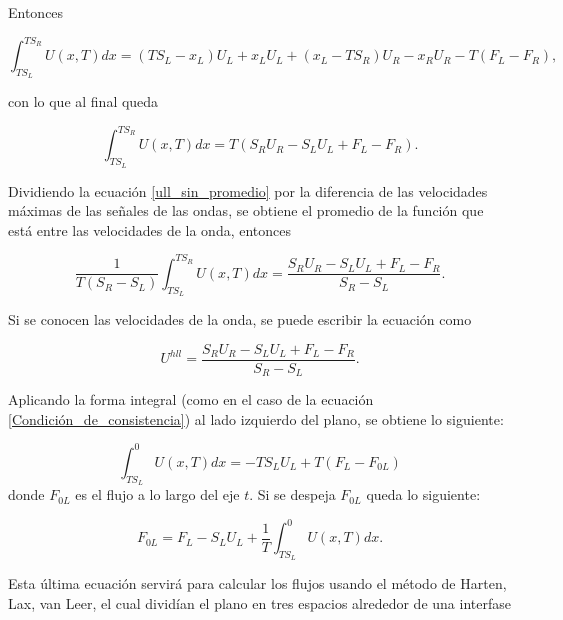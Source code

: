 \documentclass[12pt,a4paper]{book}
\begin{document}
\noindent Entonces 

\begin{equation*}
\int_{T S_L}^{T S_R} U \left(x, T \right)dx=
\left( T S_L - x_L \right) U_L+ x_L U_L +
\left( x_L - T S_R \right) U_R-x_R U_R -
T \left( F_L- F_R \right),
\end{equation*}

\noindent con lo que al final queda

\begin{equation} \label{ull_sin_promedio}
\int_{T S_L}^{T S_R} U \left(x, T \right)dx=
T \left( S_R U_R - S_L U_L + F_L - F_R \right).
\end{equation}

\noindent Dividiendo la ecuación \ref{ull_sin_promedio} por la diferencia de las velocidades máximas de las señales de las ondas, se obtiene el promedio de la función que está entre las velocidades de la onda, entonces

\begin{equation}
\frac{1}{T \left( S_R -S_L \right)}\int_{T S_L}^{T S_R} U \left(x, T \right)dx =
\frac{S_R U_R - S_L U_L + F_L - F_R}{S_R - S_L}.
\end{equation}

\noindent Si se conocen las velocidades de la onda, se puede escribir la ecuación como 

\begin{equation}\label{u_hll}
U^{hll} = \frac{S_R U_R - S_L U_L + F_L - F_R}{S_R - S_L}.
\end{equation}

\noindent Aplicando la forma integral (como en el caso de la ecuación \ref{Condición_de_consistencia}) al lado izquierdo del plano, se obtiene lo siguiente:

\begin{equation}
\int_{T S_L}^{0} U\left( x, T \right) dx = 
-T S_L U_L+T \left( F_L- F_{0L} \right)
\end{equation}
donde $F_{0L}$ es el flujo a lo largo del eje $t$. Si se despeja $F_{0L}$ queda lo siguiente:

\begin{equation}\label{ec F_0L}
F_{0L} = F_L - S_L U_L + \frac{1}{T}  \int_{T S_L}^{0} U\left( x, T \right) dx.
\end{equation}

\noindent Esta última ecuación servirá para calcular los flujos usando el método de Harten, Lax, van Leer, el cual dividían el plano en tres espacios alrededor de una interfase
\end{document}
